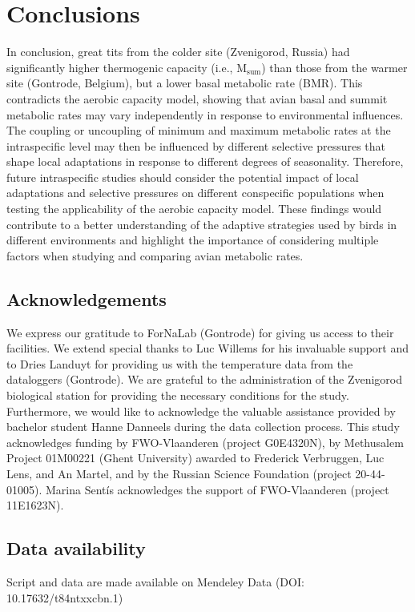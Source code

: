 \documentclass[10pt, twoside]{book} %
\begin{document}
\section{Conclusions}
In conclusion, great tits from the colder site (Zvenigorod, Russia) had significantly higher thermogenic capacity (i.e., M$_{\text{sum}}$) than those from the warmer site (Gontrode, Belgium), but a lower basal metabolic rate (BMR). This contradicts the aerobic capacity model, showing that avian basal and summit metabolic rates may vary independently in response to environmental influences. The coupling or uncoupling of minimum and maximum metabolic rates at the intraspecific level may then be influenced by different selective pressures that shape local adaptations in response to different degrees of seasonality. Therefore, future intraspecific studies should consider the potential impact of local adaptations and selective pressures on different conspecific populations when testing the applicability of the aerobic capacity model. These findings would contribute to a better understanding of the adaptive strategies used by birds in different environments and highlight the importance of considering multiple factors when studying and comparing avian metabolic rates.
\clearpage
\subsection*{Acknowledgements}
We express our gratitude to ForNaLab (Gontrode) for giving us access to their facilities. We extend special thanks to Luc Willems for his invaluable support and to Dries Landuyt for providing us with the temperature data from the dataloggers (Gontrode). We are grateful to the administration of the Zvenigorod biological station for providing the necessary conditions for the study. Furthermore, we would like to acknowledge the valuable assistance provided by bachelor student Hanne Danneels during the data collection process. This study acknowledges funding by FWO-Vlaanderen (project G0E4320N), by Methusalem Project 01M00221 (Ghent University) awarded to Frederick Verbruggen, Luc Lens, and An Martel, and by the Russian Science Foundation (project 20-44-01005). Marina Sentís acknowledges the support of FWO-Vlaanderen (project 11E1623N).
\subsection*{Data availability}
Script and data are made available on Mendeley Data (DOI: 10.17632/t84ntxxcbn.1)
\end{document}
